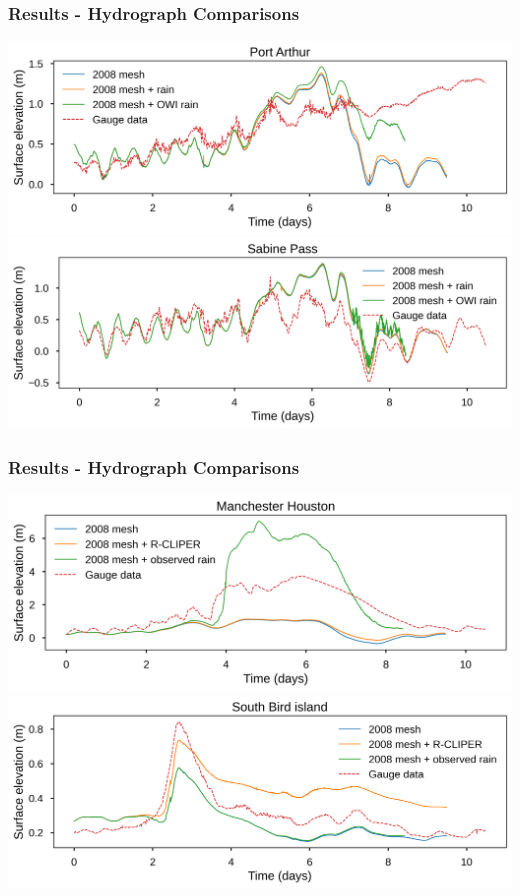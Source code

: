 \documentclass[10pt]{oden_beamer}
\begin{document}
\begin{frame}
  \frametitle{Results - Hydrograph Comparisons}
  \centering
  \includegraphics[width=0.9\linewidth]{port_arthur.png}
  \centering
  \includegraphics[width=0.9\linewidth]{sabine_pass.png}
\end{frame}

\begin{frame}
  \frametitle{Results - Hydrograph Comparisons}
  \centering
  \includegraphics[width=0.9\linewidth]{manchester.png}
  \centering
  \includegraphics[width=0.9\linewidth]{south_bird.png}
\end{frame}
\end{document}
